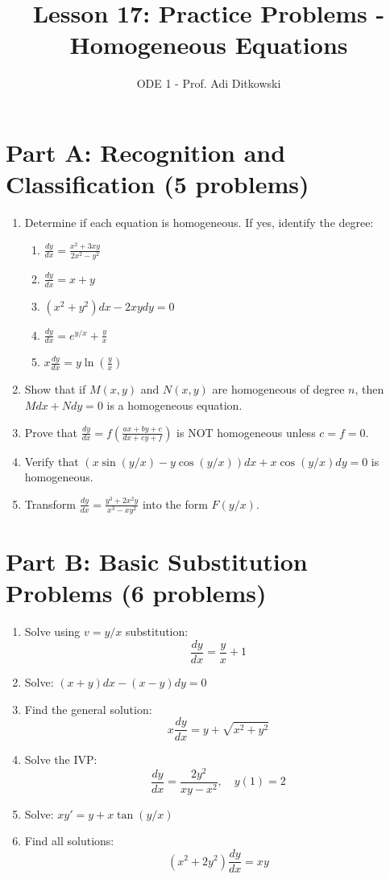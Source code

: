 \documentclass[12pt]{article}
\title{Lesson 17: Practice Problems - Homogeneous Equations}
\author{ODE 1 - Prof. Adi Ditkowski}
\date{}
\begin{document}
\maketitle

\section*{Part A: Recognition and Classification (5 problems)}

\begin{enumerate}
    \item Determine if each equation is homogeneous. If yes, identify the degree:
    \begin{enumerate}
        \item $\frac{dy}{dx} = \frac{x^2 + 3xy}{2x^2 - y^2}$
        \item $\frac{dy}{dx} = x + y$
        \item $(x^2 + y^2)dx - 2xy dy = 0$
        \item $\frac{dy}{dx} = e^{y/x} + \frac{y}{x}$
        \item $x\frac{dy}{dx} = y\ln\left(\frac{y}{x}\right)$
    \end{enumerate}

    \item Show that if $M(x,y)$ and $N(x,y)$ are homogeneous of degree $n$, then $M dx + N dy = 0$ is a homogeneous equation.

    \item Prove that $\frac{dy}{dx} = f\left(\frac{ax + by + c}{dx + ey + f}\right)$ is NOT homogeneous unless $c = f = 0$.

    \item Verify that $(x\sin(y/x) - y\cos(y/x))dx + x\cos(y/x)dy = 0$ is homogeneous.

    \item Transform $\frac{dy}{dx} = \frac{y^3 + 2x^2y}{x^3 - xy^2}$ into the form $F(y/x)$.
\end{enumerate}

\section*{Part B: Basic Substitution Problems (6 problems)}

\begin{enumerate}[resume]
    \item Solve using $v = y/x$ substitution:
    $$\frac{dy}{dx} = \frac{y}{x} + 1$$

    \item Solve: $(x + y)dx - (x - y)dy = 0$

    \item Find the general solution:
    $$x\frac{dy}{dx} = y + \sqrt{x^2 + y^2}$$

    \item Solve the IVP:
    $$\frac{dy}{dx} = \frac{2y^2}{xy - x^2}, \quad y(1) = 2$$

    \item Solve: $xy' = y + x\tan(y/x)$

    \item Find all solutions:
    $$(x^2 + 2y^2)\frac{dy}{dx} = xy$$
\end{enumerate}
\end{document}
